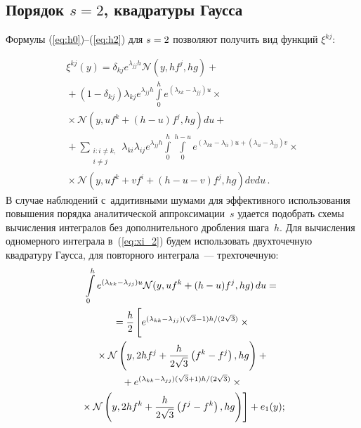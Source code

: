 \begin{multicols}{2}
\vspace*{-6pt}

   \subsection{Порядок $s=2$, квадратуры Гаусса}
   
   Формулы (\ref{eq:h0})--(\ref{eq:h2}) для $s\hm=2$ позволяют получить 
   вид функций $\xi^{kj}$:
   
   \noindent
   \begin{multline}
   \xi^{kj}(y)= \delta_{kj}
   e^{\lambda_{jj}h}\mathcal{N}(y,hf^j,hg)+ {}\\
   {}+
 \left(1-\delta_{kj}\right)\lambda_{kj}e^{\lambda_{jj}h}
 \int\limits_0^h\! e^{(\lambda_{kk}-\lambda_{jj})u}\times{}\\
 {}\times
 \mathcal{N}\left(y,uf^k+(h-u)f^j,hg\right)du + {}\\ 
 {}+
 \sum\limits_{\substack{{i:i \neq k,}\\ {i \neq j}}} 
 \lambda_{k i}\lambda_{i j} e^{\lambda_{jj}h}
\int\limits_0^{h} \!\int\limits_0^{h-u}\!
e^{(\lambda_{kk}-\lambda_{i i})u+(\lambda_{i i}-\lambda_{jj})v}\times{} \\
{}\times
\mathcal{N}\left(y,uf^k+vf^{i}+(h -u-v )f^j, hg \right) dvdu\,.
 \label{eq:xi_2}
   \end{multline}
   В случае наблюдений с~аддитивными шумами для эффективного 
   использования повышения порядка
    аналитической аппроксимации~$s$ удается 
   подобрать
    схемы вычисления интегралов без дополнительного дробления шага~$h$. 
   Для вычисления \mbox{одномерного} интеграла в~(\ref{eq:xi_2}) будем использовать 
   двухточечную квадратуру Гаусса, для повторного интеграла~--- трехточечную:
   \begin{multline*}
   \int\limits_0^h e^{(\lambda_{kk}-\lambda_{jj})u}
   \mathcal{N}(y,uf^k+(h-u)f^j,hg)\,du
   = {}\\
   {} = 
   \fr{h}{2}
   \left[
   \vphantom{\fr{h}{2\sqrt{3}}}
   e^{(\lambda_{kk}-\lambda_{jj})(\sqrt{3}-1){h}/({2\sqrt{3}})}\times{}\right.\\
   {}\times
   \mathcal{N}\left(y,2hf^j + \fr{h}{2\sqrt{3}}
   \left(f^k-f^j\right),hg\right) +{}  \\
{} +
   e^{(\lambda_{kk}-\lambda_{jj})
   ({\sqrt{3}+1})h/({2\sqrt{3}})}\times{}\\
  \left. {}\times
   \mathcal{N}\left(y,2hf^k + 
   \fr{h}{2\sqrt{3}}\left(f^j-f^k\right),hg\right)
   \right]+e_1(y);
   \end{multline*}
   

\end{multicols}
